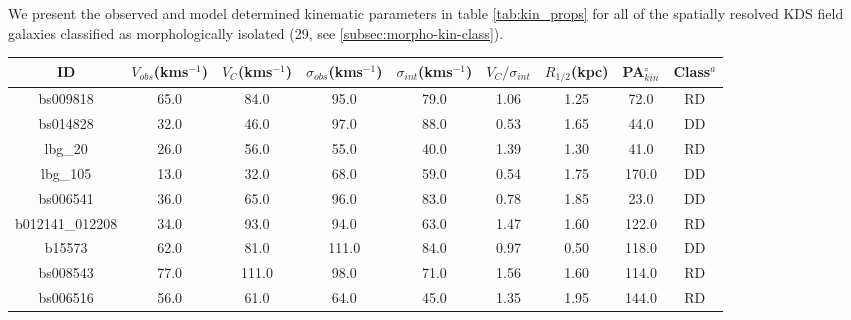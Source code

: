 \documentclass[fleqn,usenatbib]{mn2e}
\begin{document}
We present the observed and model determined kinematic parameters in table \ref{tab:kin_props} for all of the spatially resolved KDS field galaxies classified as morphologically isolated (29, see \cref{subsec:morpho-kin-class}).


\begin{table*}
\centering
\begin{threeparttable}
\caption{Dynamical Properties for the resolved and morphologically isolated KDS field galaxies}
\label{tab:kin_props}
\begin{tabular}{ccccccccc}

 \hline
ID & $V_{obs}$(kms$^{-1}$) & $V_{C}$(kms$^{-1}$) & $\sigma_{obs}$(kms$^{-1}$) & $\sigma_{int}$(kms$^{-1}$) & $V_{C}/\sigma_{int}$ & $R_{1/2}$(kpc) & PA$_{kin}^{\circ}$ & Class$^{a}$ \\
 \hline
bs009818        & 65.0                    & 84.0                     & 95.0                  & 79.0                   & 1.06       & 1.25        & 72.0 & RD \\
bs014828        & 32.0                    & 46.0                     & 97.0                  & 88.0                   & 0.53       & 1.65      & 44.0 & DD    \\
lbg\_20         & 26.0                    & 56.0                     & 55.0                  & 40.0                   & 1.39      & 1.30        & 41.0 & RD  \\
lbg\_105        & 13.0                    & 32.0                     & 68.0                  & 59.0                   & 0.54       & 1.75       & 170.0 & DD \\
bs006541        & 36.0                    & 65.0                     & 96.0                  & 83.0                   & 0.78        & 1.85       & 23.0 & DD \\
b012141\_012208 & 34.0                    & 93.0                     & 94.0                  & 63.0                   & 1.47       & 1.60       & 122.0 & RD \\
b15573          & 62.0                    & 81.0                     & 111.0                 & 84.0                   & 0.97        & 0.50       & 118.0 & DD \\
bs008543        & 77.0                    & 111.0                    & 98.0                  & 71.0                   & 1.56       & 1.60       & 114.0 & RD \\
bs006516        & 56.0                    & 61.0                     & 64.0                  & 45.0                   & 1.35      & 1.95       & 144.0 & RD  \\

\end{tabular}
\end{threeparttable}
\end{table*}
\end{document}
